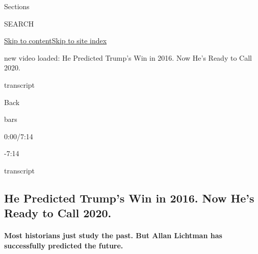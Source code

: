 Sections

SEARCH

\protect\hyperlink{site-content}{Skip to
content}\protect\hyperlink{site-index}{Skip to site index}

new video loaded: He Predicted Trump's Win in 2016. Now He's Ready to
Call 2020.

transcript

Back

bars

0:00/7:14

-7:14

transcript

\hypertarget{he-predicted-trumps-win-in-2016-now-hes-ready-to-call-2020}{%
\subsection{He Predicted Trump's Win in 2016. Now He's Ready to Call
2020.}\label{he-predicted-trumps-win-in-2016-now-hes-ready-to-call-2020}}

\hypertarget{most-historians-just-study-the-past-but-allan-lichtman-has-successfully-predicted-the-future}{%
\paragraph{Most historians just study the past. But Allan Lichtman has
successfully predicted the
future.}\label{most-historians-just-study-the-past-but-allan-lichtman-has-successfully-predicted-the-future}}

